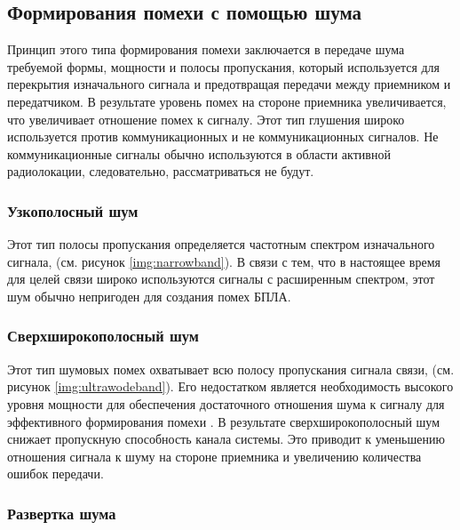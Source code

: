\subsection*{Формирования помехи с помощью шума}

Принцип этого типа формирования помехи заключается в передаче шума требуемой формы, мощности и полосы пропускания, который используется для перекрытия изначального сигнала и предотвращая передачи между приемником и передатчиком. В результате уровень помех на стороне приемника увеличивается, что увеличивает отношение помех к сигналу. Этот тип глушения широко используется \cite{uavneutralize} против коммуникационных и не коммуникационных сигналов. Не коммуникационные сигналы обычно \cite{uavneutralize} используются в области активной радиолокации, следовательно, рассматриваться не будут.

\subsubsection*{Узкополосный шум}

Этот тип полосы пропускания определяется частотным спектром изначального сигнала, (см. рисунок \ref{img:narrowband}). В связи с тем, что в настоящее время для целей связи широко используются сигналы с расширенным спектром, этот шум обычно непригоден для создания помех БПЛА.


\FloatBarrier

\subsubsection*{Сверхширокополосный шум}

Этот тип шумовых помех охватывает всю полосу пропускания сигнала связи, (см. рисунок \ref{img:ultrawodeband}). Его недостатком является необходимость высокого уровня мощности для обеспечения достаточного отношения шума к сигналу для эффективного формирования помехи \cite{advanddisadvuwb}. В результате сверхширокополосный шум снижает пропускную способность канала системы. Это приводит к уменьшению отношения сигнала к шуму на стороне приемника и увеличению количества ошибок передачи.


\FloatBarrier

\subsubsection*{Развертка шума}
 
